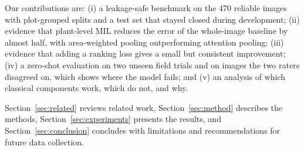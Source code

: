 Our contributions are: (i) a leakage-safe benchmark on the 470 reliable images with plot-grouped
splits and a test set that stayed closed during development; (ii) evidence that plant-level MIL
reduces the error of the whole-image baseline by almost half, with area-weighted pooling
outperforming attention pooling; (iii) evidence that adding a ranking loss gives a small but
consistent improvement; (iv) a zero-shot evaluation on two unseen field trials and on images the
two raters disagreed on, which shows where the model fails; and (v) an analysis of which classical
components work, which do not, and why.

Section~\ref{sec:related} reviews related work, Section~\ref{sec:method} describes the methods,
Section~\ref{sec:experiments} presents the results, and Section~\ref{sec:conclusion} concludes with
limitations and recommendations for future data collection.
